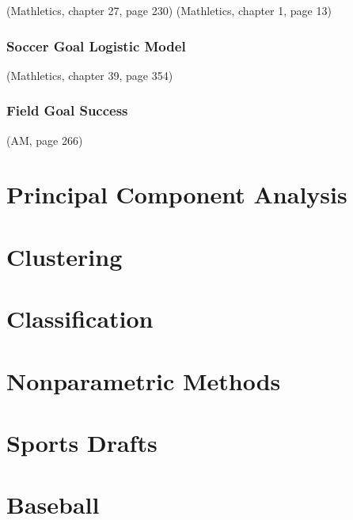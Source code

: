 \documentclass[
  11pt,
]{book}
\theoremstyle{definition}
\theoremstyle{definition}
\theoremstyle{definition}
\theoremstyle{definition}
\theoremstyle{remark}
\begin{document}
(Mathletics, chapter 27, page 230)
(Mathletics, chapter 1, page 13)

\hypertarget{soccer-goal-logistic-model}{%
\subsection{Soccer Goal Logistic Model}\label{soccer-goal-logistic-model}}

(Mathletics, chapter 39, page 354)

\hypertarget{field-goal-success}{%
\subsection{Field Goal Success}\label{field-goal-success}}

(AM, page 266)

\newpage

\hypertarget{principal-component-analysis}{%
\chapter{Principal Component Analysis}\label{principal-component-analysis}}

\hypertarget{clustering}{%
\chapter{Clustering}\label{clustering}}

\hypertarget{classification}{%
\chapter{Classification}\label{classification}}

\hypertarget{nonparametric-methods}{%
\chapter{Nonparametric Methods}\label{nonparametric-methods}}

\hypertarget{sports-drafts}{%
\chapter{Sports Drafts}\label{sports-drafts}}

\hypertarget{baseball-1}{%
\chapter{Baseball}\label{baseball-1}}
\end{document}
